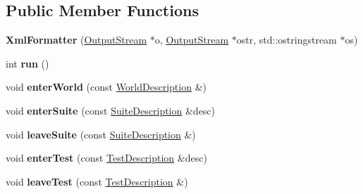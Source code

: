 \subsection*{Public Member Functions}
\begin{DoxyCompactItemize}
\item 
\hypertarget{classCxxTest_1_1XmlFormatter_a7a41e83cbe6a9e7dbbd8cadbbf42926d}{{\bfseries Xml\-Formatter} (\hyperlink{classCxxTest_1_1OutputStream}{Output\-Stream} $\ast$o, \hyperlink{classCxxTest_1_1OutputStream}{Output\-Stream} $\ast$ostr, std\-::ostringstream $\ast$os)}\label{classCxxTest_1_1XmlFormatter_a7a41e83cbe6a9e7dbbd8cadbbf42926d}

\item 
\hypertarget{classCxxTest_1_1XmlFormatter_ac9a6f63962a65eff3a3f4fb35e915bf2}{int {\bfseries run} ()}\label{classCxxTest_1_1XmlFormatter_ac9a6f63962a65eff3a3f4fb35e915bf2}

\item 
\hypertarget{classCxxTest_1_1XmlFormatter_a519dc69c261fb9a3a65a2e7170b631ec}{void {\bfseries enter\-World} (const \hyperlink{classCxxTest_1_1WorldDescription}{World\-Description} \&)}\label{classCxxTest_1_1XmlFormatter_a519dc69c261fb9a3a65a2e7170b631ec}

\item 
\hypertarget{classCxxTest_1_1XmlFormatter_a9d8d702349bc2a3c44acb7414e5a3855}{void {\bfseries enter\-Suite} (const \hyperlink{classCxxTest_1_1SuiteDescription}{Suite\-Description} \&desc)}\label{classCxxTest_1_1XmlFormatter_a9d8d702349bc2a3c44acb7414e5a3855}

\item 
\hypertarget{classCxxTest_1_1XmlFormatter_a12b78b0490867d01b1954d6529144cc8}{void {\bfseries leave\-Suite} (const \hyperlink{classCxxTest_1_1SuiteDescription}{Suite\-Description} \&)}\label{classCxxTest_1_1XmlFormatter_a12b78b0490867d01b1954d6529144cc8}

\item 
\hypertarget{classCxxTest_1_1XmlFormatter_abbd07cd50766e1be3278455dae25efe8}{void {\bfseries enter\-Test} (const \hyperlink{classCxxTest_1_1TestDescription}{Test\-Description} \&desc)}\label{classCxxTest_1_1XmlFormatter_abbd07cd50766e1be3278455dae25efe8}

\item 
\hypertarget{classCxxTest_1_1XmlFormatter_a7ec6f98e1fc53cdea57a19140c318a8e}{void {\bfseries leave\-Test} (const \hyperlink{classCxxTest_1_1TestDescription}{Test\-Description} \&)}\label{classCxxTest_1_1XmlFormatter_a7ec6f98e1fc53cdea57a19140c318a8e}


\end{DoxyCompactItemize}
